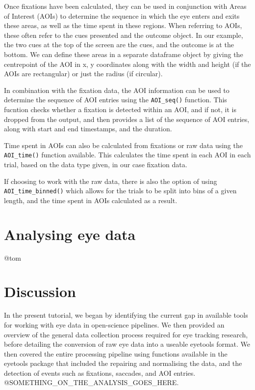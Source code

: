 \documentclass[
  man,
  floatsintext,
  longtable,
  nolmodern,
  notxfonts,
  notimes,
  colorlinks=true,linkcolor=blue,citecolor=blue,urlcolor=blue]{apa7}
\begin{document}
Once fixations have been calculated, they can be used in conjunction
with Areas of Interest (AOIs) to determine the sequence in which the eye
enters and exits these areas, as well as the time spent in these
regions. When referring to AOIs, these often refer to the cues presented
and the outcome object. In our example, the two cues at the top of the
screen are the cues, and the outcome is at the bottom. We can define
these areas in a separate dataframe object by giving the centrepoint of
the AOI in x, y coordinates along with the width and height (if the AOIs
are rectangular) or just the radius (if circular).

In combination with the fixation data, the AOI information can be used
to determine the sequence of AOI entries using the \texttt{AOI\_seq()}
function. This fucntion checks whether a fixation is detected within an
AOI, and if not, it is dropped from the output, and then provides a list
of the sequence of AOI entries, along with start and end timestamps, and
the duration.

Time spent in AOIs can also be calculated from fixations or raw data
using the \texttt{AOI\_time()} function available. This calculates the
time spent in each AOI in each trial, based on the data type given, in
our case fixation data.

If choosing to work with the raw data, there is also the option of using
\texttt{AOI\_time\_binned()} which allows for the trials to be split
into bins of a given length, and the time spent in AOIs calculated as a
result.

\section{Analysing eye data}\label{analysing-eye-data}

@tom

\section{Discussion}\label{discussion}

In the present tutorial, we began by identifying the current gap in
available tools for working with eye data in open-science pipelines. We
then provided an overview of the general data collection process
required for eye tracking research, before detailing the conversion of
raw eye data into a useable eyetools format. We then covered the entire
processing pipeline using functions available in the eyetools package
that included the repairing and normalising the data, and the detection
of events such as fixations, saccades, and AOI entries.
@SOMETHING\_ON\_THE\_ANALYSIS\_GOES\_HERE.
\end{document}
